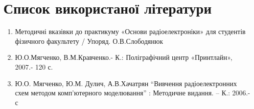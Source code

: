 \section{Список використаної літератури}
\begin{enumerate}
  \item Методичні вказівки до практикуму «Основи радіоелектроніки» для студентів фізичного факультету / Упоряд. О.В.Слободянюк
  \item Ю.О.Мягченко, В.М.Кравченко.- К.: Поліграфічний центр «Принтлайн», 2007.- 120 с.
  \item Ю.О. Мягченко, Ю.М. Дулич, А.В.Хачатрян “Вивчення
радіоелектронних схем методом комп’ютерного моделювання” :
Методичне видання. – К.: 2006.- с
\end{enumerate}
